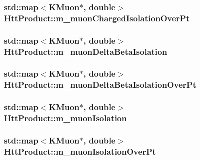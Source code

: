 \label{classHttProduct_a39b3d69fe737078f76c46dae49670add}
\hypertarget{classHttProduct_a12dbd2d89ff730740180bcdf6e375089}{
\subsubsection[{m\_\-muonChargedIsolationOverPt}]{\setlength{\rightskip}{0pt plus 5cm}std::map$<$KMuon$\ast$, double$>$ {\bf HttProduct::m\_\-muonChargedIsolationOverPt}}}
\label{classHttProduct_a12dbd2d89ff730740180bcdf6e375089}
\hypertarget{classHttProduct_a25a663d9b0c0c232d8b25834fd82a922}{
\subsubsection[{m\_\-muonDeltaBetaIsolation}]{\setlength{\rightskip}{0pt plus 5cm}std::map$<$KMuon$\ast$, double$>$ {\bf HttProduct::m\_\-muonDeltaBetaIsolation}}}
\label{classHttProduct_a25a663d9b0c0c232d8b25834fd82a922}
\hypertarget{classHttProduct_a3cdbe21e10c8bd9e790732191ecd5776}{
\subsubsection[{m\_\-muonDeltaBetaIsolationOverPt}]{\setlength{\rightskip}{0pt plus 5cm}std::map$<$KMuon$\ast$, double$>$ {\bf HttProduct::m\_\-muonDeltaBetaIsolationOverPt}}}
\label{classHttProduct_a3cdbe21e10c8bd9e790732191ecd5776}
\hypertarget{classHttProduct_a56c9bfb7b1ef1191b730bb36a9fc9972}{
\subsubsection[{m\_\-muonIsolation}]{\setlength{\rightskip}{0pt plus 5cm}std::map$<$KMuon$\ast$, double$>$ {\bf HttProduct::m\_\-muonIsolation}}}
\label{classHttProduct_a56c9bfb7b1ef1191b730bb36a9fc9972}
\hypertarget{classHttProduct_aa378e6264b7559aa9e86a5aa691f60a7}{
\subsubsection[{m\_\-muonIsolationOverPt}]{\setlength{\rightskip}{0pt plus 5cm}std::map$<$KMuon$\ast$, double$>$ {\bf HttProduct::m\_\-muonIsolationOverPt}}}
